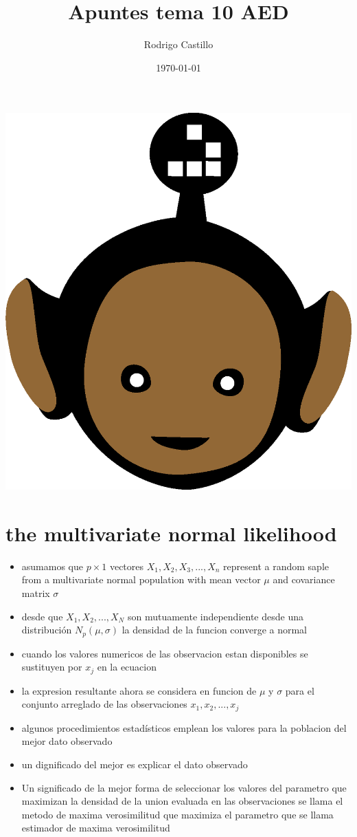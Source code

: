 \documentclass[10pt,a4paper]{article} %
\begin{document}
    \title{{  Apuntes tema 10 AED  }}
    \author{{Rodrigo Castillo}}
    \date{\today}

    \maketitle


    \includegraphics[width=0.1\linewidth]{negro_cara.png}

    \section{the multivariate normal likelihood}
        \begin{itemize}
            \item {asumamos que $ p \times 1  $  vectores $ X_1 , X_2 , X_3 ,
                ... , X_n  $  represent a random saple from a multivariate
                normal population with mean vector $ \mu  $  and covariance
                matrix
                $ \sigma   $  }
            \item {desde que $ X_1 , X_2 , ... , X_N  $ son mutuamente
                independiente desde una distribución $ N_p(\mu,\sigma )  $  la
            densidad de la funcion converge a normal }
        \end{itemize}

        \begin{itemize}
            \item {cuando los valores numericos de las observacion estan
                disponibles se sustituyen por $ x_j  $ en la ecuacion}
            \item {la expresion resultante ahora se considera en funcion de $
                \mu  $  y $ \sigma   $  para el conjunto arreglado de las
                observaciones $ x_1 , x_2 , ... , x_j  $ }
            \item {algunos procedimientos estadísticos emplean los valores para
                la poblacion del mejor dato observado}
            \item {un dignificado del \color{red} mejor \color{white} es
                explicar el dato observado}
            \item {Un significado de la mejor forma de seleccionar los valores
                del parametro que maximizan la densidad de la union evaluada en
                    las observaciones se llama el \color{blue} metodo de maxima
                    verosimilitud \color{white}  que maximiza el parametro que se llama
                \color{blue} estimador de maxima verosimilitud \color{white} }
        \end{itemize}
\end{document}
